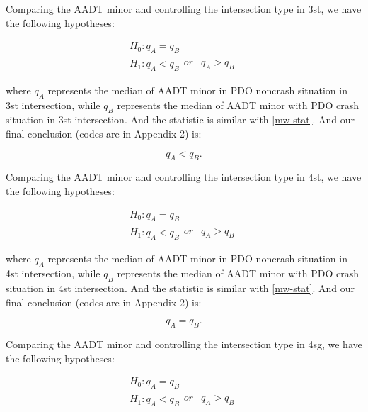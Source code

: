 \documentclass[11pt]{scrartcl} %
\begin{document}
Comparing the AADT minor and controlling the intersection type in 3st, we have the following hypotheses:

\begin{equation*}
\begin{array}{l}
{H_0}:{q_A} = {q_B}\\
{H_1}:{q_A} < {q_B}\begin{array}{*{20}{c}}
{or}&{{q_A} > {q_B}}
\end{array}
\end{array}
\end{equation*}

where $q_A$ represents the median of AADT minor in PDO noncrash situation in 3st intersection, while $q_B$ represents the median of AADT minor with PDO crash situation in 3st intersection. And the statistic is similar with \eqref{mw-stat}. And our final conclusion (codes are in Appendix 2) is:

\begin{equation*}
{q_A} < {q_B}.
\end{equation*}

\par

Comparing the AADT minor and controlling the intersection type in 4st, we have the following hypotheses:

\begin{equation*}
\begin{array}{l}
{H_0}:{q_A} = {q_B}\\
{H_1}:{q_A} < {q_B}\begin{array}{*{20}{c}}
{or}&{{q_A} > {q_B}}
\end{array}
\end{array}
\end{equation*}

where $q_A$ represents the median of AADT minor in PDO noncrash situation in 4st intersection, while $q_B$ represents the median of AADT minor with PDO crash situation in 4st intersection. And the statistic is similar with \eqref{mw-stat}. And our final conclusion (codes are in Appendix 2) is:

\begin{equation*}
{q_A} = {q_B}.
\end{equation*}

\par

Comparing the AADT minor and controlling the intersection type in 4sg, we have the following hypotheses:

\begin{equation*}
\begin{array}{l}
{H_0}:{q_A} = {q_B}\\
{H_1}:{q_A} < {q_B}\begin{array}{*{20}{c}}
{or}&{{q_A} > {q_B}}
\end{array}
\end{array}
\end{equation*}
\end{document}
